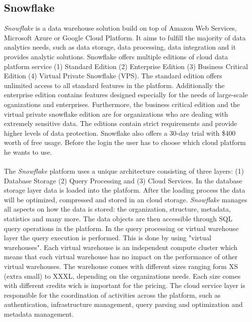 \documentclass[../paper.tex]{subfiles}
\begin{document}
\subsection{Snowflake}
\textit{Snowflake} is a data warehouse solution build on top of Amazon Web Services, Microsoft  Azure or Google Cloud Platform. It aims to fulfill the majority of data analytics needs, such as data storage, data processing, data integration and it provides analytic solutions. Snowflake offers multiple editions of cloud data platform service (1) Standard Edition (2) Enterprise Edition (3) Business Critical Edition (4) Virtual Private Snowflake (VPS). 
The standard  edition offers unlimited access to all standard features in the platform. Additionally the enterprise edition contains features designed especially for the needs of large-scale oganizations and enterprises.
Furthermore, the business critical edition and the virtual private snowflake edition are for organizations who are dealing with extremely sensitive data. The editions contain strict requirements and provide higher levels of data protection. Snowflake also offers a 30-day trial with \$400 worth of free usage. Before the login the user has to choose which cloud platform he wants to use.
\\ \\
The \textit{Snowflake} platform uses a unique architecture consisting of three layers: (1) Database Storage (2) Query Processing and (3) Cloud Services. In the database storage layer data is loaded into the platform. After the loading process the data will be optimized, compressed and stored in an cloud storage. 
\textit{Snowflake} manages all aspects on how the data is stored: the organization, structure, metadata, statistics and many more. The data objects are then accessible through SQL query operations in the platform.
In the query processing or virtual warehouse layer the query execution is performed. This is done by using "virtual warehouses". Each virtual warehouse is an independent compute cluster which means that each virtual warehouse has no impact on the performance of other virtual warehouses. The warehouse comes with different sizes ranging form XS (extra small) to XXXL, depending on the organizations needs. Each size comes with different credits wich is important for the pricing. The cloud service layer is responsible for the coordination of activities across the platform, such as authentication, infrastructure management, query parsing and optimization and metadata management. 
\\ \\
\end{document}
